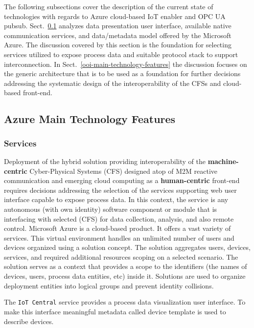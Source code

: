 \documentclass{jacsart}
\begin{document}
The following subsections cover the description of the current state of technologies with regards to Azure cloud-based IoT enabler and OPC UA pubsub. Sect.~\ref*{azure-main-technology-features} analyzes data presentation user interface, available native communication services, and data/metadata model offered by the Microsoft Azure. The discussion covered by this section is the foundation for selecting services utilized to expose process data and suitable protocol stack to support interconnection. In Sect.~\ref*{ooi-main-technology-features} the discussion focuses on the generic architecture that is to be used as a foundation for further decisions addressing the systematic design of the interoperability of the CFSs and cloud-based front-end.

\subsection{Azure Main Technology Features}\label{azure-main-technology-features}

\subsubsection{Services}\label{services}

Deployment of the hybrid solution providing interoperability of the
\textbf{machine-centric} Cyber-Physical Systems (CFS) designed atop of M2M
reactive communication and emerging cloud computing as a
\textbf{human-centric} front-end requires decisions addressing the
selection of the services supporting web user interface capable to
expose process data. In this context, the service is any
autonomous (with own identity) software component or module that is
interfacing with selected (CFS) for data collection,
analysis, and also remote control. Microsoft Azure is a cloud-based
product. It offers a vast variety of services. This virtual environment
handles an unlimited number of users and devices organized using a
solution concept. The solution aggregates users, devices, services, and
required additional resources scoping on a selected scenario. The
solution serves as a context that provides a scope to the identifiers
(the names of devices, users, process data entities, etc) inside it.
Solutions are used to organize deployment entities into logical groups
and prevent identity collisions.

The \texttt{IoT\ Central} service provides a process data visualization
user interface. To make this interface meaningful metadata called device
template is used to describe devices.
\end{document}
